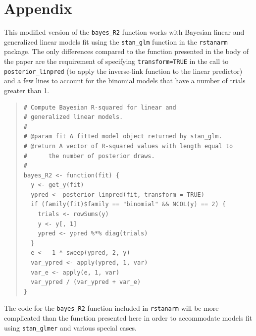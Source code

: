 \documentclass[11pt]{article}
\begin{document}
\section*{Appendix}

This modified version of the \verb#bayes_R2# function works with
Bayesian linear and generalized linear models fit using the 
\verb#stan_glm# function in the {\tt rstanarm} package. The only 
differences compared to the function presented in the body of the paper are 
the requirement of specifying \verb#transform=TRUE# in the call to 
\verb#posterior_linpred# (to apply the inverse-link function to the linear 
predictor) and a few lines to account for the binomial models that
have a number of trials greater than 1. 
%
\vspace{-\baselineskip}
\begin{quotation}
\noindent
\begin{small}
\begin{verbatim}
# Compute Bayesian R-squared for linear and
# generalized linear models.
#
# @param fit A fitted model object returned by stan_glm.
# @return A vector of R-squared values with length equal to
#      the number of posterior draws.
#
bayes_R2 <- function(fit) {
  y <- get_y(fit)
  ypred <- posterior_linpred(fit, transform = TRUE)
  if (family(fit)$family == "binomial" && NCOL(y) == 2) {
    trials <- rowSums(y)
    y <- y[, 1]
    ypred <- ypred %*% diag(trials)
  }
  e <- -1 * sweep(ypred, 2, y)
  var_ypred <- apply(ypred, 1, var)
  var_e <- apply(e, 1, var)
  var_ypred / (var_ypred + var_e)
}
\end{verbatim}
\end{small}
\end{quotation}

\noindent The code for the \verb#bayes_R2# function included in {\tt rstanarm} will be 
more complicated than the function presented here in order to accommodate models fit 
using \verb#stan_glmer# and various special cases.
\end{document}
